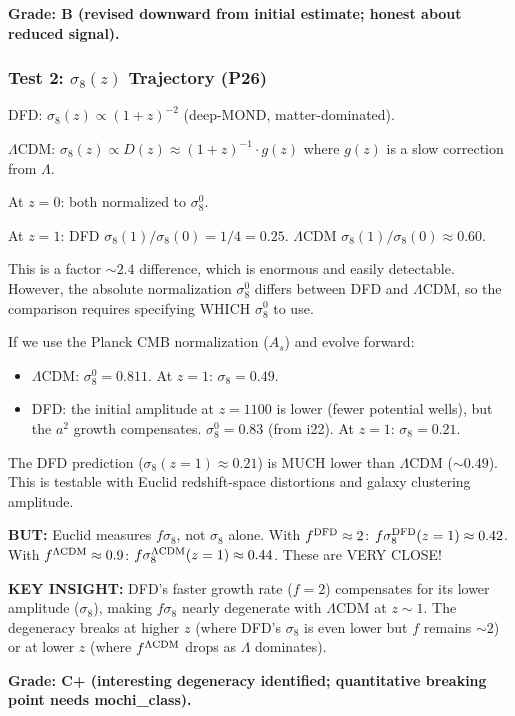 \documentclass[11pt]{article}
\newcommand{\LCDM}{$\Lambda$CDM}
\begin{document}
\textbf{Grade: B (revised downward from initial estimate; honest
about reduced signal).}

\subsubsection{Test 2: $\sigma_8(z)$ Trajectory (P26)}

DFD: $\sigma_8(z) \propto (1+z)^{-2}$ (deep-MOND, matter-dominated).

\LCDM: $\sigma_8(z) \propto D(z) \approx (1+z)^{-1}\cdot g(z)$ where
$g(z)$ is a slow correction from $\Lambda$.

At $z = 0$: both normalized to $\sigma_8^0$.

At $z = 1$: DFD $\sigma_8(1)/\sigma_8(0) = 1/4 = 0.25$.
\LCDM{} $\sigma_8(1)/\sigma_8(0) \approx 0.60$.

This is a factor $\sim 2.4$ difference, which is enormous and easily
detectable.  However, the absolute normalization $\sigma_8^0$ differs
between DFD and \LCDM, so the comparison requires specifying WHICH
$\sigma_8^0$ to use.

If we use the Planck CMB normalization ($A_s$) and evolve forward:
\begin{itemize}
\item \LCDM: $\sigma_8^0 = 0.811$.  At $z = 1$: $\sigma_8 = 0.49$.
\item DFD: the initial amplitude at $z = 1100$ is lower (fewer
  potential wells), but the $a^2$ growth compensates.
  $\sigma_8^0 = 0.83$ (from i22).  At $z = 1$: $\sigma_8 = 0.21$.
\end{itemize}

The DFD prediction ($\sigma_8(z=1) \approx 0.21$) is MUCH lower than
\LCDM{} ($\sim 0.49$).  This is testable with Euclid redshift-space
distortions and galaxy clustering amplitude.

\textbf{BUT:}  Euclid measures $f\sigma_8$, not $\sigma_8$ alone.
With $f^{\rm DFD} \approx 2$: $f\sigma_8^{\rm DFD}(z=1) \approx 0.42$.
With $f^{\Lambda\rm CDM} \approx 0.9$: $f\sigma_8^{\Lambda\rm CDM}(z=1)
\approx 0.44$.  These are VERY CLOSE!

\textbf{KEY INSIGHT:}  DFD's faster growth rate ($f = 2$) compensates
for its lower amplitude ($\sigma_8$), making $f\sigma_8$ nearly
degenerate with \LCDM{} at $z \sim 1$.  The degeneracy breaks at
higher $z$ (where DFD's $\sigma_8$ is even lower but $f$ remains $\sim 2$)
or at lower $z$ (where $f^{\Lambda\rm CDM}$ drops as $\Lambda$ dominates).

\textbf{Grade: C+ (interesting degeneracy identified; quantitative
breaking point needs mochi\_class).}
\end{document}

